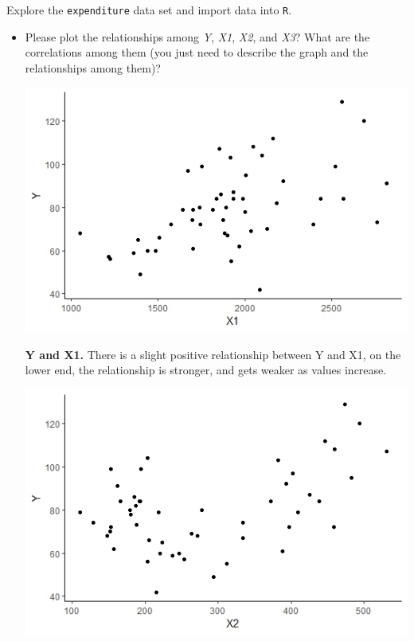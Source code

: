 \documentclass[12pt,letterpaper]{article}
\begin{document}
\vspace{.5cm}
\noindent Explore the \texttt{expenditure} data set and import data into \texttt{R}.
\vspace{.5cm}
  
\vspace{.5cm}
\begin{itemize}

\item
Please plot the relationships among \emph{Y}, \emph{X1}, \emph{X2}, and \emph{X3}? What are the correlations among them (you just need to describe the graph and the relationships among them)?

\includegraphics{YandX1}

\textbf{Y and X1.} There is a slight positive relationship between Y and X1, on the lower end, the relationship is stronger, and gets weaker as values increase.
\vspace{.5cm}

\includegraphics{YandX2}


\end{itemize}
\end{document}
